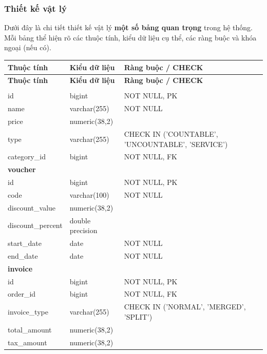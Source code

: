 \subsubsection{Thiết kế vật lý}

Dưới đây là chi tiết thiết kế vật lý \textbf{một số bảng quan trọng} trong hệ thống. Mỗi bảng thể hiện rõ các thuộc tính, kiểu dữ liệu cụ thể, các ràng buộc và khóa ngoại (nếu có).

\begin{longtable}{|p{3.5cm}|p{3.5cm}|p{7.5cm}|}
\hline
\textbf{Thuộc tính} & \textbf{Kiểu dữ liệu} & \textbf{Ràng buộc / CHECK} \\
\hline
\endfirsthead

\hline
\textbf{Thuộc tính} & \textbf{Kiểu dữ liệu} & \textbf{Ràng buộc / CHECK} \\
\hline
\endhead

\hline
\endfoot

\hline
\endlastfoot

\multicolumn{3}{|l|}{\textbf{product}} \\
\hline
id & bigint & NOT NULL, PK \\
name & varchar(255) & NOT NULL \\
price & numeric(38,2) & \\
type & varchar(255) & CHECK IN ('COUNTABLE', 'UNCOUNTABLE', 'SERVICE') \\
category\_id & bigint & NOT NULL, FK \\
\hline

\multicolumn{3}{|l|}{\textbf{voucher}} \\
\hline
id & bigint & NOT NULL, PK \\
code & varchar(100) & NOT NULL \\
discount\_value & numeric(38,2) & \\
discount\_percent & double precision & \\
start\_date & date & NOT NULL \\
end\_date & date & NOT NULL \\
\hline

\multicolumn{3}{|l|}{\textbf{invoice}} \\
\hline
id & bigint & NOT NULL, PK \\
order\_id & bigint & NOT NULL, FK \\
invoice\_type & varchar(255) & CHECK IN ('NORMAL', 'MERGED', 'SPLIT') \\
total\_amount & numeric(38,2) & \\
tax\_amount & numeric(38,2) & \\
\hline


\end{longtable}
